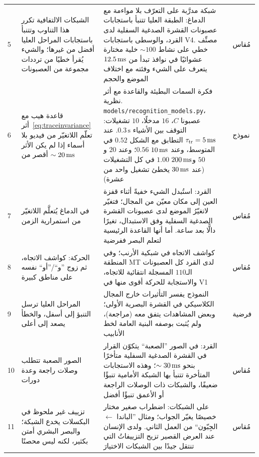 {\begin{longtable}{>{\raggedright}p{0.5cm}>{\raggedright}p{4.0cm}>{\raggedright}p{5.6cm}>{\raggedright}p{2.3cm}>{\raggedright\arraybackslash}p{1.7cm}}
5 & الشبكات الالتفافية تكرر هذا التناوب وتتنبأ باستجابات المراحل العليا أفضل من غيرها؛ والشيء يُقرأ خطيًا من ترددات مجموعة من العصبونات & شبكة مدرَّبة على التعرّف بلا مواءمة مع الدماغ: الطبقة العليا تتنبأ باستجابات عصبونات القشرة الصدغية السفلية لدى القرد، والوسطى باستجابات \foreignlanguage{english}{V4}. مصنِّف خطي على نشاط $\sim100$ خلية مختارة عشوائيًا في نوافذ تبدأ من $12.5\,\text{ms}$ يتعرف على الشيء وفئته مع اختلاف الموضع والحجم & \cite{Fukushima1980,Yamins2014,Hung2005} & مُقاس \\
6 & قاعدة هيب مع أثر~\eqref{eq:traceinvariance} تعلّم اللاتغيّر من فيديو بلا أسماء إذا لم يكن الأثر أقصر من $\sim20\,\text{ms}$ & فكرة السمات البطيئة والقاعدة مع أثر نظرية. \foreignlanguage{english}{\texttt{models/\allowbreak recognition\_models.py}}، عصبونا $C$، $16$ مدخلًا، $10$ تشغيلات: التوقف بين الأشياء $0.3\,\text{s}$. عند $\tau_{\text{tr}}=5\,\text{ms}$ التطابق مع الشكل $0.52$ في المتوسط، وعند $10\,\text{ms}$ $0.56$؛ وعند $20$ و$50$ و$200\,\text{ms}$ $1.00$ في كل التشغيلات (عند $30\,\text{ms}$ يخطئ تشغيل واحد من عشرة) & \cite{Foldiak1991,WiskottSejnowski2002} & نموذج \\
7 & في الدماغ يُتعلَّم اللاتغيّر من استمرارية الزمن & القرد: استُبدل الشيء خفيةً أثناء قفزة العين إلى مكان معيّن من المجال؛ فتغيّر لاتغيّرُ الموضع لدى عصبونات القشرة الصدغية السفلية وفق الاستبدال، تغيرًا دالًّا بعد ساعة. أما أنها القاعدة الرئيسية لتعلم البصر ففرضية & \cite{LiDiCarlo2008} & مُقاس \\
8 & الحركة: كواشف الاتجاه، ثم زوج ”و“/”أو“ نفسه على مناطق كبيرة & كواشف الاتجاه في شبكية الأرنب؛ وفي المنطقة \foreignlanguage{english}{MT} لدى القرد كل العصبونات الـ$110$ المسجلة انتقائية للاتجاه، والاستجابة للحركة أقوى منها في \foreignlanguage{english}{V1} & \cite{Barlow1965,Albright1984} & مُقاس \\
9 & المراحل العليا ترسل التنبؤ إلى أسفل، والخطأ يصعد إلى أعلى & النموذج يفسر التأثيرات خارج المجال الكلاسيكي في القشرة البصرية الأولى؛ وبعض المشاهدات يتفق معه (مراجعة)، ولم يُثبت بوصفه البنية العامة لخط الأنابيب & \cite{RaoBallard1999,Keller2018} & فرضية \\
10 & الصور الصعبة تتطلب وصلات راجعة وعدة دورات & القرد: في الصور ”الصعبة“ يتكوّن القرار في القشرة الصدغية السفلية متأخرًا بنحو $\sim30\,\text{ms}$؛ وهذه الاستجابات المتأخرة تتنبأ بها الشبكة الأمامية تنبؤًا ضعيفًا، والشبكات ذات الوصلات الراجعة أو الأعمق تنبؤًا أفضل & \cite{Kar2019} & مُقاس \\
11 & تزييف غير ملحوظ في البكسلات يخدع الشبكة؛ والبصر البشري أمتن بكثير، لكنه ليس محصنًا & على الشبكات: اضطراب صغير مختار خصيصًا يغيّر الجواب؛ ومثال ”الباندا $\leftarrow$ الجِبّون“ من العمل الثاني. ولدى الإنسان عند العرض القصير تزيح التزييفاتُ التي تنتقل جيدًا بين الشبكات الاختيارَ & \cite{Szegedy2014,Goodfellow2015,Elsayed2018} & مُقاس \\

\end{longtable}}
